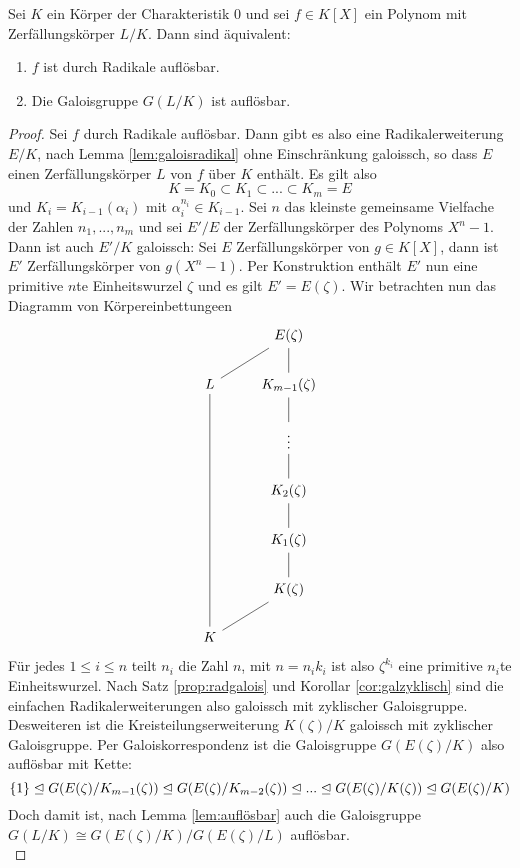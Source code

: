 \documentclass{book}
\begin{document}
\begin{thm}
    \label{thm:main}
    Sei $K$ ein Körper der Charakteristik $0$ und sei $f \in K[X]$ ein Polynom
    mit Zerfällungskörper $L/K$. Dann sind äquivalent:
    \begin{enumerate}[label= (\roman *)]
        \item $f$ ist durch Radikale auflösbar. 
        \item Die Galoisgruppe $G(L/K)$ ist auflösbar. 
    \end{enumerate}
\end{thm}
\begin{proof}
    Sei $f$ durch Radikale auflösbar. Dann gibt es also eine Radikalerweiterung $E/K$, nach 
    Lemma \ref{lem:galoisradikal} ohne Einschränkung galoissch, so dass $E$
    einen Zerfällungskörper $L$ von $f$ über $K$ enthält. Es gilt also 
    \[
        K = K_0 \subset K_1 \subset ... \subset K_m = E
    \]
    und $K_i = K_{i-1}(\alpha_i)$ mit $\alpha_i^{n_i} \in K_{i-1}$. Sei $n$ das
    kleinste gemeinsame Vielfache der Zahlen $n_1, ..., n_m$ und sei $E'/E$ der
    Zerfällungskörper des Polynoms $X^n - 1$. Dann ist auch $E'/K$ galoissch:
    Sei $E$ Zerfällungskörper von $g \in K[X]$, dann ist $E'$ Zerfällungskörper
    von $g (X^n -1)$. Per Konstruktion enthält $E'$ nun eine primitive $n$te
    Einheitswurzel $\zeta$ und es gilt $E' = E(\zeta)$. Wir betrachten nun das Diagramm von Körpereinbettungeen
    \[
    \begin{tikzcd}
        & E(\zeta)\\
     L\ar[dash]{ur}    & K_{m-1}(\zeta) \ar[dash]{u}\\
                &  \vdots\ar[dash]{u}\\
                & K_2(\zeta) \ar[dash]{u}\\
                & K_1(\zeta) \ar[dash]{u}\\
     &  K(\zeta) \ar[dash]{u}\\
    K \ar[dash]{ur}\ar[dash]{uuuuu} & 
    \end{tikzcd}
    \]
    Für jedes $1 \le i \le n$ teilt $n_i$ die Zahl $n$, mit $n = n_i k_i$ ist
    also $\zeta^{k_i}$ eine primitive $n_i$te Einheitswurzel. Nach Satz
    \ref{prop:radgalois} und Korollar \ref{cor:galzyklisch} sind die einfachen
    Radikalerweiterungen also galoissch mit zyklischer Galoisgruppe.
    Desweiteren ist die Kreisteilungserweiterung $K(\zeta)/K$ galoissch mit
    zyklischer Galoisgruppe. Per Galoiskorrespondenz ist die Galoisgruppe
    $G(E(\zeta)/K)$ also auflösbar mit Kette:
    \[
        \{1\} \trianglelefteq G(E(\zeta)/K_{m-1}(\zeta)) \trianglelefteq G(E(\zeta)/K_{m-2}(\zeta)) \trianglelefteq ... \trianglelefteq G(E(\zeta)/K(\zeta)) \trianglelefteq G(E(\zeta)/K)
    \]
    Doch damit ist, nach Lemma \ref{lem:auflösbar} auch die Galoisgruppe
    $G(L/K) \cong G(E(\zeta)/K)/G(E(\zeta)/L)$ auflösbar.\\


\end{proof}
\end{document}
